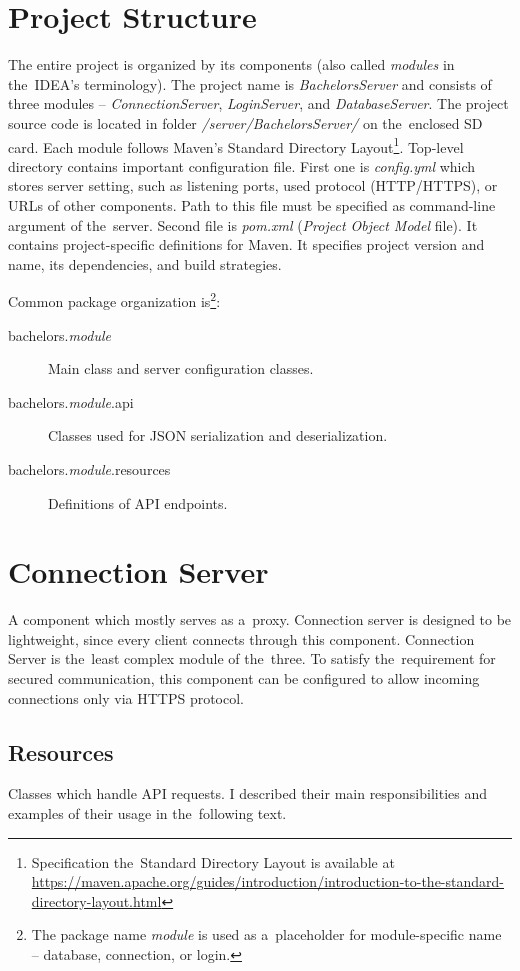 \section{Project Structure}
The entire project is organized by its components (also called \textit{modules} in the~IDEA's terminology). The project name is \textit{BachelorsServer} and consists of three modules -- \textit{ConnectionServer}, \textit{LoginServer}, and \textit{DatabaseServer}. The project source code is located in folder \textit{/server/BachelorsServer/} on the~enclosed SD card. Each module follows Maven's Standard Directory Layout\footnote{Specification the~Standard Directory Layout is available at \url{https://maven.apache.org/guides/introduction/introduction-to-the-standard-directory-layout.html}}. Top-level directory contains important configuration file. First one is \textit{config.yml} which stores server setting, such as listening ports, used protocol (HTTP/HTTPS), or URLs of other components. Path to this file must be specified as command-line argument of the~server. Second file is \textit{pom.xml} (\textit{Project Object Model} file). It contains project-specific definitions for Maven. It specifies project version and name, its dependencies, and build strategies. 

\noindent Common package organization is\footnote{The package name \textit{module} is used as a~placeholder for module-specific name -- database, connection, or login.}:
\begin{description}
	\item[bachelors.\textit{module}] Main class and server configuration classes.
	\item[bachelors.\textit{module}.api] Classes used for JSON serialization and deserialization.
	\item[bachelors.\textit{module}.resources] Definitions of API endpoints.
\end{description}

\section{Connection Server}
A component which mostly serves as a~proxy. Connection server is designed to be lightweight, since every client connects through this component. Connection Server is the~least complex module of the~three. To satisfy the~requirement for secured communication, this component can be configured to allow incoming connections only via HTTPS protocol.  

\subsection{Resources}
Classes which handle API requests. I described their main responsibilities and examples of their usage in the~following text.

